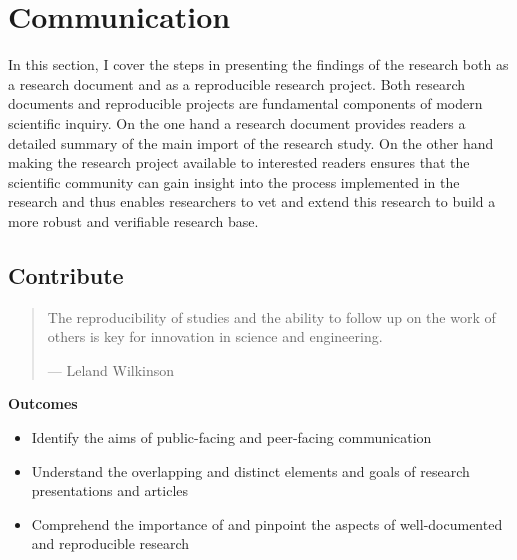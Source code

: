 \documentclass[
  letterpaper,
]{latex/krantz}
\providecommand{\tightlist}{%
  \setlength{\itemsep}{0pt}\setlength{\parskip}{0pt}}\usepackage{longtable,booktabs,array}
\theoremstyle{definition}
\theoremstyle{remark}
\begin{document}
\part{Communication}

In this section, I cover the steps in presenting the findings of the
research both as a research document and as a reproducible research
project. Both research documents and reproducible projects are
fundamental components of modern scientific inquiry. On the one hand a
research document provides readers a detailed summary of the main import
of the research study. On the other hand making the research project
available to interested readers ensures that the scientific community
can gain insight into the process implemented in the research and thus
enables researchers to vet and extend this research to build a more
robust and verifiable research base.

\chapter{Contribute}\label{sec-contribute-chapter}

\begin{quote}
The reproducibility of studies and the ability to follow up on the work
of others is key for innovation in science and engineering.

--- Leland Wilkinson
\end{quote}

\begin{tcolorbox}[enhanced jigsaw, colframe=quarto-callout-color-frame, breakable, bottomrule=.15mm, arc=.35mm, left=2mm, opacityback=0, rightrule=.15mm, colback=white, toprule=.15mm, leftrule=.75mm]

\textbf{ Outcomes}

\begin{itemize}
\tightlist
\item
  Identify the aims of public-facing and peer-facing communication
\item
  Understand the overlapping and distinct elements and goals of research
  presentations and articles
\item
  Comprehend the importance of and pinpoint the aspects of
  well-documented and reproducible research
\end{itemize}

\end{tcolorbox}
\end{document}
